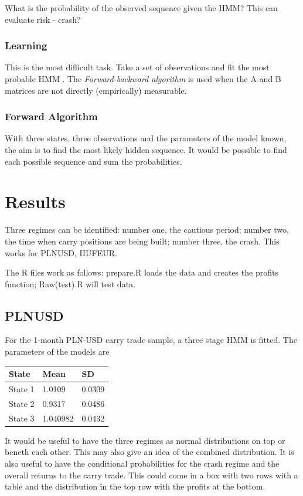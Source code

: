 \documentclass[12pt, a4paper, oneside]{article} %
\begin{document}
What is the probability of the observed sequence given the HMM? This can evaluate risk - crash? 

\subsubsection{Learning}
This is the most difficult task.  Take a set of observations and fit the most probable HMM . The \emph{Forward-backward algorithm} is used when the A and B matrices are not directly (empirically) measurable.  

\subsubsection{Forward Algorithm}
With three states, three observations and the parameters of the model known, the aim is to find the most likely hidden sequence.  It would be possible to find each possible sequence and sum the probabilities.  





\section{Results}
Three regimes can be identified: number one, the cautious period; number two, the time when carry positions are being built; number three, the crash.  This works for PLNUSD, HUFEUR. 

The R files work as follows: prepare.R loads the data and creates the profits function; Raw(test).R will test data. 

\subsection{PLNUSD}
For the 1-month PLN-USD carry trade sample, a three stage HMM is fitted.  The parameters of the models are 

\begin{tabular}{l | l l}
State & Mean & SD \\
\hline
State 1 & 1.0109 & 0.0309\\
State 2 & 0.9317 & 0.0486\\
State 3 & 1.040982 & 0.0432\\
\end{tabular}

It would be useful to have the three regimes as normal distributions on top or beneth each other. This may also give an idea of the combined distribution.  It is also useful to have the conditional probabilities for the crash regime and the overall returns to the carry trade.  This could come in a box with two rows with a table and the distribution in the top row with the profits at the bottom. 
\end{document}
